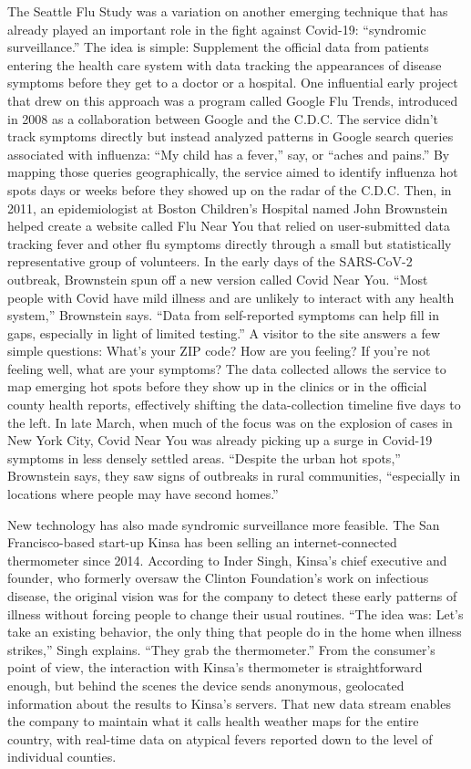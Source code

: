 The Seattle Flu Study was a variation on another emerging technique that
has already played an important role in the fight against Covid-19:
``syndromic surveillance.'' The idea is simple: Supplement the official
data from patients entering the health care system with data tracking
the appearances of disease symptoms before they get to a doctor or a
hospital. One influential early project that drew on this approach was a
program called Google Flu Trends, introduced in 2008 as a collaboration
between Google and the C.D.C. The service didn't track symptoms directly
but instead analyzed patterns in Google search queries associated with
influenza: ``My child has a fever,'' say, or ``aches and pains.'' By
mapping those queries geographically, the service aimed to identify
influenza hot spots days or weeks before they showed up on the radar of
the C.D.C. Then, in 2011, an epidemiologist at Boston Children's
Hospital named John Brownstein helped create a website called Flu Near
You that relied on user-submitted data tracking fever and other flu
symptoms directly through a small but statistically representative group
of volunteers. In the early days of the SARS-CoV-2 outbreak, Brownstein
spun off a new version called Covid Near You. ``Most people with Covid
have mild illness and are unlikely to interact with any health system,''
Brownstein says. ``Data from self-reported symptoms can help fill in
gaps, especially in light of limited testing.'' A visitor to the site
answers a few simple questions: What's your ZIP code? How are you
feeling? If you're not feeling well, what are your symptoms? The data
collected allows the service to map emerging hot spots before they show
up in the clinics or in the official county health reports, effectively
shifting the data-collection timeline five days to the left. In late
March, when much of the focus was on the explosion of cases in New York
City, Covid Near You was already picking up a surge in Covid-19 symptoms
in less densely settled areas. ``Despite the urban hot spots,''
Brownstein says, they saw signs of outbreaks in rural communities,
``especially in locations where people may have second homes.''

New technology has also made syndromic surveillance more feasible. The
San Francisco-based start-up Kinsa has been selling an
internet-connected thermometer since 2014. According to Inder Singh,
Kinsa's chief executive and founder, who formerly oversaw the Clinton
Foundation's work on infectious disease, the original vision was for the
company to detect these early patterns of illness without forcing people
to change their usual routines. ``The idea was: Let's take an existing
behavior, the only thing that people do in the home when illness
strikes,'' Singh explains. ``They grab the thermometer.'' From the
consumer's point of view, the interaction with Kinsa's thermometer is
straightforward enough, but behind the scenes the device sends
anonymous, geolocated information about the results to Kinsa's servers.
That new data stream enables the company to maintain what it calls
health weather maps for the entire country, with real-time data on
atypical fevers reported down to the level of individual counties.

